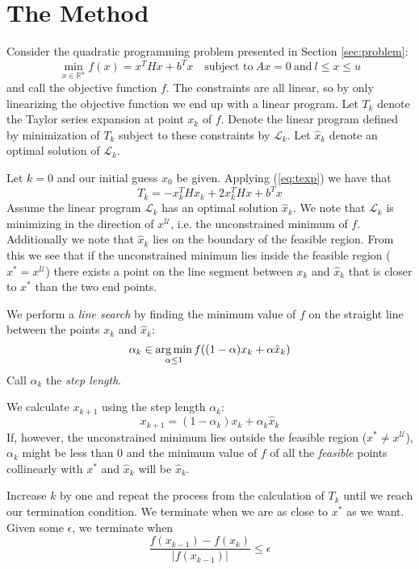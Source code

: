 \section{The Method}
\label{sec:method}
Consider the quadratic programming problem presented in Section
\ref{sec:problem}:
\[
\min_{x \in \mathbb{R}^n} f(x) = x^T H x + b^T x
\quad \textrm{subject to}
~
Ax = 0
~
\textrm{and}
~
l \le x \le u
\]
and call the objective function $f$.
The constraints are all linear, so by only linearizing the objective function
we end up with a linear program.
Let $T_k$ denote the Taylor series expansion at point $x_k$ of $f$.
Denote the linear program defined by minimization of $T_k$ subject to these
constraints by $\mathcal{L}_k$.
Let $\hat{x}_k$ denote an optimal solution of $\mathcal{L}_k$.

Let $k = 0$ and our initial guess $x_0$ be given.
Applying (\ref{eq:texp}) we have that
\[
T_k = - x_k^THx_k + 2x_k^THx + b^Tx
\]
Assume the linear program $\mathcal{L}_k$ has an optimal solution $\hat{x}_k$.
We note that $\mathcal{L}_k$ is minimizing in the direction of
$x^{\mathcal{U}}$, i.e. the unconstrained minimum of $f$.
Additionally we note that $\hat{x}_k$ lies on the boundary of the feasible
region.
From this we see that if the unconstrained minimum lies inside the feasible
region ($x^* = x^\mathcal{U}$) there exists a point on the line segment between
$x_k$ and $\hat{x}_k$ that is closer to $x^*$ than the two end points.

We perform a \emph{line search} by finding the minimum value of $f$ on the
straight line between the points $x_k$ and $\hat{x}_k$:
\[
\alpha_k \in \operatorname*{arg\,min}_{\alpha \leq 1} f((1-\alpha) x_k + \alpha \hat{x}_k)
\]
Call $\alpha_k$ the \emph{step length}.

We calculate $x_{k+1}$ using the step length $\alpha_k$:
\[
x_{k+1} = (1-\alpha_k) x_k + \alpha_k\hat{x}_k
\]
If, however, the unconstrained minimum lies outside the feasible region
($x^* \neq x^\mathcal{U}$), $\alpha_k$ might be less than $0$ and the minimum
value of $f$ of all the \emph{feasible} points collinearly with $x^*$ and
$\hat{x}_k$ will be $\hat{x}_k$.

Increase $k$ by one and repeat the process from the calculation of $T_k$ until
we reach our termination condition.
We terminate when we are as close to $x^*$ as we want.
Given some $\epsilon$, we terminate when
\[
\frac{f(x_{k-1}) - f(x_k)}{|f(x_{k-1})|} \leq \epsilon
\]


